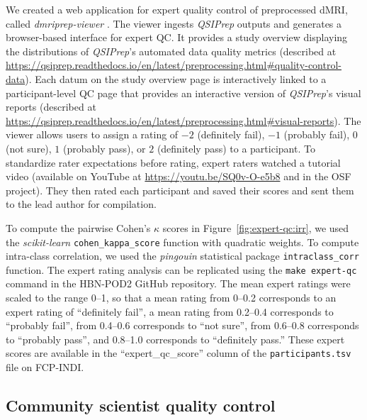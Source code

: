 \documentclass[fleqn,10pt,inline]{wlscirep}
\begin{document}
We created a web application for expert quality control of preprocessed dMRI,
called \emph{dmriprep-viewer} \cite{richie-halford2021-viewer}. The viewer
ingests \emph{QSIPrep} outputs and generates a browser-based interface for
expert QC. It provides a study overview displaying the distributions of
\emph{QSIPrep}'s automated data quality metrics (described at
\url{https://qsiprep.readthedocs.io/en/latest/preprocessing.html#quality-control-data}).
Each datum on the study overview page is interactively linked to a participant-level
QC page that provides an interactive version of \emph{QSIPrep}'s visual reports
(described at
\url{https://qsiprep.readthedocs.io/en/latest/preprocessing.html#visual-reports}).
The viewer allows users to assign a rating of $-2$ (definitely fail), $-1$
(probably fail), $0$ (not sure), $1$ (probably pass), or $2$ (definitely pass) to a
participant. To standardize rater expectations before rating, expert raters watched
a tutorial video (available on YouTube at \url{https://youtu.be/SQ0v-O-e5b8} and in the OSF project). They then rated each
participant and saved their scores and sent them to the lead author for compilation.

To compute the pairwise Cohen's $\kappa$ scores in Figure~\ref{fig:expert-qc:irr}, we
used the \emph{scikit-learn} \cite{scikit-learn} \texttt{cohen\_kappa\_score}
function with quadratic weights. To compute intra-class correlation, we used the
\emph{pingouin} statistical package \cite{vallat2018pingouin}
\texttt{intraclass\_corr} function. The expert rating analysis can be replicated
using the \texttt{make expert-qc} command in the HBN-POD2 GitHub repository.
The mean expert ratings were scaled to the range \numrange{0}{1}, so that a mean rating from \numrange{0}{0.2} corresponds to an expert rating of ``definitely fail'', a mean rating from \numrange{0.2}{0.4} corresponds to ``probably fail'', from \numrange{0.4}{0.6} corresponds to ``not sure'', from \numrange{0.6}{0.8} corresponds to ``probably pass'', and \numrange{0.8}{1.0} corresponds to ``definitely pass.'' These expert scores are available in the
``expert\_qc\_score'' column of the \texttt{participants.tsv} file on FCP-INDI.

\subsection*{Community scientist quality control}
\end{document}
